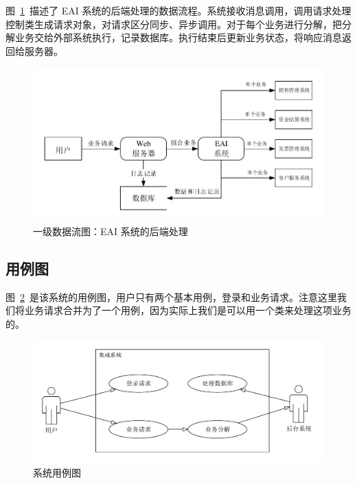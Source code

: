 \documentclass[cs4size,a4paper,nofonts]{ctexart}
\begin{document}
图~\ref{dfd1.2}~描述了 EAI 系统的后端处理的数据流程。系统接收消息调用，调用请求处理控制类生成请求对象，对请求区分同步、异步调用。对于每个业务进行分解，把分解业务交给外部系统执行，记录数据库。执行结束后更新业务状态，将响应消息返回给服务器。

\begin{figure}[htp]
\centering
\includegraphics[width=\textwidth,page=3]{images/dfd.pdf}
\caption{\label{dfd1.2}一级数据流图：EAI 系统的后端处理}
\end{figure}


\subsection{用例图}

图~\ref{uc1}~是该系统的用例图，用户只有两个基本用例，登录和业务请求。注意这里我们将业务请求合并为了一个用例，因为实际上我们是可以用一个类来处理这项业务的。

\begin{figure}[htp]
\includegraphics[width=\textwidth,page=1]{images/ucs.pdf}
\caption{\label{uc1}系统用例图}
\end{figure}
\end{document}
